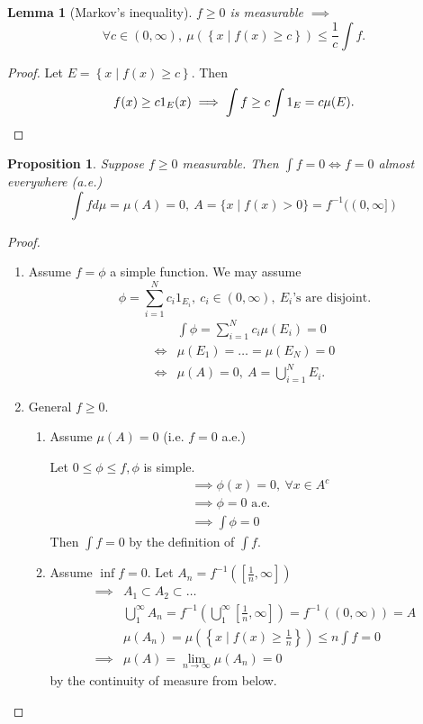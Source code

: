 \documentclass{report}
\newtheorem{lemma}[theorem]{Lemma}
\newtheorem{proposition}[theorem]{Proposition}
\theoremstyle{definition}
\theoremstyle{remark}
\begin{document}
\begin{lemma}[Markov's inequality]
	$f \geq 0$ is measurable $\implies$ \[\forall c \in (0, \infty),\ \mu\left(\left\lbrace x \mid f(x) \geq c \right\rbrace\right) \leq \frac{1}{c}\int f.\]
\end{lemma}
\begin{proof}
	Let $E = \left\lbrace x \mid f(x) \geq c \right\rbrace$. Then \[f(x) \geq c1_{E}(x) \implies \int f \geq c\int 1_E = c \mu(E). \qedhere\] 
\end{proof}
\begin{proposition}\label{prop:zeroint}
	Suppose $f \geq 0$ measurable. Then $\int f = 0 \iff f = 0$ almost everywhere (a.e.) \[\int f d\mu = \mu(A) = 0,\ A = \{x \mid f(x) > 0\} = f^{-1}((0, \infty])\]
\end{proposition}
\begin{proof}
	\begin{enumerate}
		\item Assume $f = \phi$ a simple function. We may assume \[\phi = \sum_{i=1}^N c_i1_{E_i},\ c_i \in (0, \infty),\ E_i\text{'s are disjoint.}\]
		\begin{align*}
			& \int \phi = \sum_{i=1}^N c_i \mu(E_i) = 0 \\
		\iff & \mu(E_1) = \ldots = \mu(E_N) = 0 \\
		\iff & \mu(A) = 0,\ A = \bigcup_{i=1}^N E_i.
		\end{align*}

		\item General $f \geq 0$. \begin{enumerate}
			\item Assume $\mu(A) = 0$ (i.e. $f = 0$ a.e.)
			
			Let $0 \leq \phi \leq f, \phi$ is simple.
			\begin{align*}
				& \implies \phi(x) = 0,\ \forall x \in A^c \\
				& \implies \phi = 0 \text{ a.e.} \\
				& \implies \int \phi = 0
			\end{align*}
			Then $\int f = 0$ by the definition of $\int f$.

			\item Assume $\inf f = 0$. Let $A_n = f^{-1}\left(\left[\frac{1}{n}, \infty\right]\right)$
			\begin{align*}
				\implies & A_1 \subset A_2 \subset \ldots \\
				& \bigcup_1^\infty A_n = f^{-1}\left(\bigcup_1^\infty\left[\frac{1}{n}, \infty\right]\right) = f^{-1}((0, \infty)) = A \\
				& \mu(A_n) = \mu\left(\left\lbrace x \mid f(x) \geq \frac{1}{n}\right\rbrace\right) \leq n \int f = 0 \\
				\implies & \mu(A) = \lim_{n \to \infty} \mu(A_n) = 0
			\end{align*}
			by the continuity of measure from below. \qedhere
		\end{enumerate}
	\end{enumerate}
\end{proof}
\end{document}
